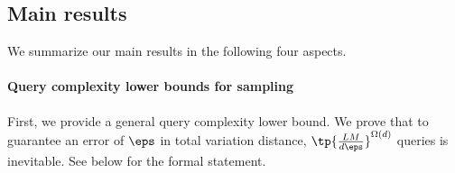 \documentclass[11pt,a4paper]{article}
\begin{document}



\subsection{Main results}
We summarize our main results in the following four aspects.

\paragraph{Query complexity lower bounds for sampling}



First, we provide a general query complexity lower bound. We prove that to guarantee an error of $\eps$ in total variation distance, $\tp{\frac{LM}{d\eps}}^{\Omega(d)}$ queries is inevitable. See  below for the formal statement. 
\end{document}
